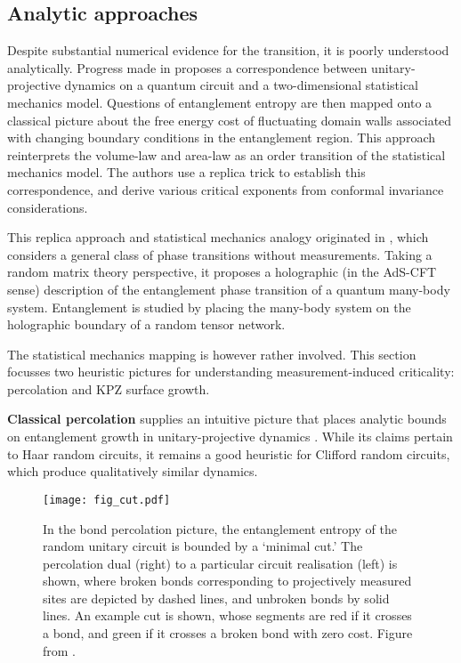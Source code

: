 \documentclass[10pt]{article}
\begin{document}
\subsection{Analytic approaches}

Despite substantial numerical evidence for the transition, it is poorly understood analytically. Progress made in \cite{jian2019measurement} proposes a correspondence between unitary-projective dynamics on a quantum circuit and a two-dimensional statistical mechanics model. Questions of entanglement entropy are then mapped onto a classical picture about the free energy cost of fluctuating domain walls associated with changing boundary conditions in the entanglement region. This approach reinterprets the volume-law and area-law as an order transition of the statistical mechanics model. The authors use a replica trick to establish this correspondence, and derive various critical exponents from conformal invariance considerations. 

This replica approach and statistical mechanics analogy originated in \cite{vasseur2019entanglement}, which considers a general class of phase transitions without measurements. Taking a random matrix theory perspective, it proposes a holographic (in the AdS-CFT sense) description of the entanglement phase transition of a quantum many-body system. Entanglement is studied by placing the many-body system on the holographic boundary of a random tensor network.


The statistical mechanics mapping is however rather involved. This section focusses two heuristic pictures for understanding measurement-induced criticality: percolation and KPZ surface growth. 

\textbf{Classical percolation} supplies an intuitive picture that places analytic bounds on entanglement growth in unitary-projective dynamics \cite{nahum2017quantum, skinner2019measurement}. While its claims pertain to Haar random circuits, it remains a good heuristic for Clifford random circuits, which produce qualitatively similar dynamics.

\begin{figure}
\centering
\texttt{[image: fig\_cut.pdf]}
\caption{In the bond percolation picture, the entanglement entropy of the random unitary circuit is bounded by a `minimal cut.' The percolation dual (right) to a particular circuit realisation (left) is shown, where broken bonds corresponding to projectively measured sites are depicted by dashed lines, and unbroken bonds by solid lines. An example cut is shown, whose segments are red if it crosses a bond, and green if it crosses a broken bond with zero cost. Figure from \cite{skinner2019measurement}.}
\label{fig_cut}
\end{figure}
\end{document}
